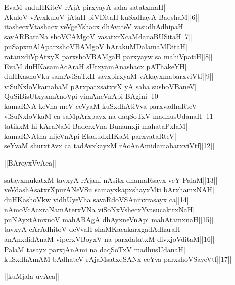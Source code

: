 \documentclass{article}
\begin{document}
EvaM suduHKiteV rAjA pirxyayA saha satatxmaH|\\
AkuloV vAyxkuloV jAtaH piVDitaH kuSxdhayA BaqshaM||6||\\
itashecxVtashacx veVgeYshacx dhAvateV vasudhAdhipaH|\\
savARBaraNa shoVCAMgoV vasatxrXcaMdanaBUSitaH||7||\\
puSapxmAlAparxshoVBAMgoV hArakuMDalamaMDitaH|\\
ratanxdiVpAtxyX parxshoVBAMgaH parxyayw sa mahiVpatiH||8||\\
EvaM duHKasamAcAraH sUtxyamAnashacx pAThakeYH|\\
duHKashoVka samAviSaTxH savxpirxyaM vAkayxmabarxviVtf||9||\\
viSuNxloVkamahaM pArxpatxsatxvX yA saha sushoVBaneV|\\
QuSiBisUtxyamAnoVpi vimAneVnApi BAgini||10||\\
kamaRNA keVna meV ceVyaM kuSxdhAtiVva parxvadhaRteV|\\
viSuNxloVkaM ca saMpArxpayx na daqSoTxV madhusUdanaH||11||\\
tatikxM hi kAraNaM BaderxVna Bunamxji mahataPxlaM|\\
kamaRNAtha nijeVnApi EtadudxHKaM parxvataRteV|\\
seYvaM shurxtAvx ca tadAvxkayxM  rAcAnAmidamabarxviVtf||12||\\

\begin{center}
||BAroyxVvAca||
\end{center}

satayxmukatxM tavxyA rAjanf nAsitx dhamaRsayx veY PalaM||13||\\
veVdashAsatxrXpurANeVSu samayxkapxshayxMti bArxhamxNAH|\\
duHKashoVkw vidhUyeVha savaRdoVSAninxrasayx ca||14||\\
nAmoVcAcxraNamAterxVNa viSoNxVshecxYvasucakirxNaH|\\
puNAyxtAmxnoV mahABAgA dhAyxneVnApi mahAtamxnaH||15||\\
tavxyA cArAdhitoV deVvaH shaMKacakarxgadAdharaH|\\
anAnxdidAnaM viperxVBoyxV na parxdatatxM divxjoVditaM||16||\\
PalaM tasayx parxjAnAmi na daqSoTxV madhusUdanaH|\\
kuSxdhAmAM bAdhateV rAjaMsatxqSANx ceYva parxshoVSayeVtf||17||\\

\begin{center}
||kuMjala uvAca||
\end{center}
\end{document}
